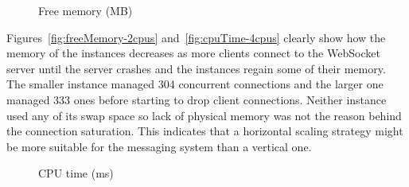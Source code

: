\begin{figure}[h!]
	\centering
	 \hfill
	\caption{Free memory (MB)}
	\label{fig:freeMemory}
\end{figure}

\noindent
Figures~\ref{fig:freeMemory-2cpus} and~\ref{fig:cpuTime-4cpus} clearly show how the memory of the instances decreases as more clients connect to the WebSocket server until the server crashes and the instances regain some of their memory. The smaller instance managed 304 concurrent connections and the larger one managed 333 ones before starting to drop client connections. Neither instance used any of its swap space so lack of physical memory was not the reason behind the connection saturation. This indicates that a horizontal scaling strategy might be more suitable for the messaging system than a vertical one.
\\
\begin{figure}[h!]
	\centering
	 \hfill
	\caption{CPU time  (ms)}
\end{figure}

